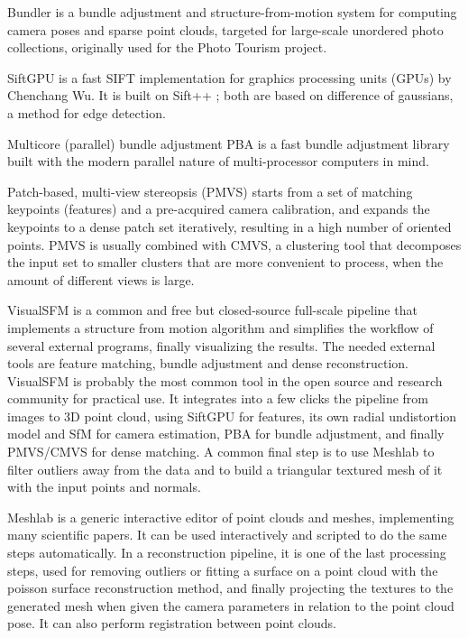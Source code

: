 Bundler is a bundle adjustment and structure-from-motion system for computing camera poses and sparse point clouds, targeted for large-scale unordered photo collections, originally used for the Photo Tourism project. \cite{snavely2006photo}

SiftGPU is a fast SIFT implementation for graphics processing units (GPUs) by Chenchang Wu. \cite{changchang2007siftgpu}
It is built on Sift++ \cite{vedaldi2011sift++}; both are based on difference of gaussians, a method for edge detection. \cite{marr1980theory}

Multicore (parallel) bundle adjustment PBA is a fast bundle adjustment library built with the modern parallel nature of multi-processor computers in mind. \cite{wu2011multicore}

Patch-based, multi-view stereopsis (PMVS) starts from a set of matching keypoints (features) and a pre-acquired camera calibration, and expands the keypoints to a dense patch set iteratively, resulting in a high number of oriented points.
PMVS is usually combined with CMVS, a clustering tool that decomposes the input set to smaller clusters that are more convenient to process, when the amount of different views is large. \cite{furukawa2010accurate,furukawa2012patch}

VisualSFM \cite{wu2013towards} is a common and free but closed-source full-scale pipeline that implements a structure from motion algorithm and simplifies the workflow of several external programs, finally visualizing the results.
The needed external tools are feature matching, bundle adjustment and dense reconstruction.
VisualSFM is probably the most common tool in the open source and research community for practical use.
It integrates into a few clicks the pipeline from images to 3D point cloud, using SiftGPU for features, its own radial undistortion model and SfM for camera estimation, PBA for bundle adjustment, and finally PMVS/CMVS for dense matching.
A common final step is to use Meshlab to filter outliers away from the data and to build a triangular textured mesh of it with the input points and normals.

Meshlab \cite{meshlab} is a generic interactive editor of point clouds and meshes, implementing many scientific papers.
It can be used interactively and scripted to do the same steps automatically.
In a reconstruction pipeline, it is one of the last processing steps, used for removing outliers or fitting a surface on a point cloud with the poisson surface reconstruction method, and finally projecting the textures to the generated mesh when given the camera parameters in relation to the point cloud pose.
It can also perform registration between point clouds.

